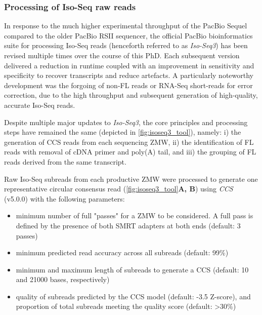 \clearpage
\subsubsection{Processing of Iso-Seq raw reads}
\label{section: Isoseq_rawprocessing}
In response to the much higher experimental throughput of the PacBio Sequel compared to the older PacBio RSII sequencer, the official PacBio bioinformatics suite for processing Iso-Seq reads (henceforth referred to as \textit{Iso-Seq3}) has been revised multiple times over the course of this PhD. Each subsequent version delivered a reduction in runtime coupled with an improvement in sensitivity and specificity to recover transcripts and reduce artefacts. A particularly noteworthy development was the forgoing of non-FL reads or RNA-Seq short-reads for error correction, due to the high throughput and subsequent generation of high-quality, accurate Iso-Seq reads. 

Despite multiple major updates to \textit{Iso-Seq3}, the core principles and processing steps have remained the same (depicted in \cref{fig:isoseq3_tool}), namely: i) the generation of CCS reads from each sequencing ZMW, ii) the identification of FL reads with removal of cDNA primer and poly(A) tail, and iii) the grouping of FL reads derived from the same transcript. 

Raw Iso-Seq subreads from each productive ZMW were processed to generate one representative circular consensus read (\cref{fig:isoseq3_tool}\textbf{A, B}) using \textit{CCS} (v5.0.0) with the following parameters: 
\begin{itemize}
	\item minimum number of full "passes" for a ZMW to be considered. A full pass is defined by the presence of both SMRT adapters at both ends (default: 3 passes)
	\item minimum predicted read accuracy across all subreads (default: 99\%)
	\item minimum and maximum length of subreads to generate a CCS (default: 10 and 21000 bases, respectively)
	\item quality of subreads predicted by the CCS model (default: -3.5 Z-score), and proportion of total subreads meeting the quality score (default: \textgreater 30\%)
\end{itemize}


